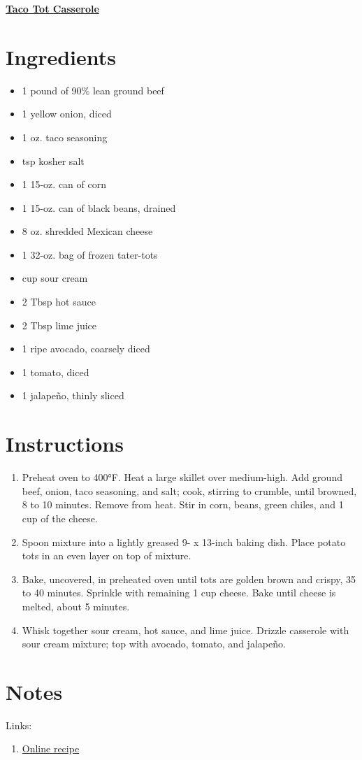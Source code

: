 \documentclass[11pt]{article}
\begin{document}
	\begin{center}\begin{huge}\underline{\textbf{Taco Tot Casserole}}\end{huge}\end{center}

	\section*{Ingredients}
	\begin{itemize}
		\item 1 pound of 90\% lean ground beef
		\item 1 yellow onion, diced
		\item 1 oz. taco seasoning
		\item {} tsp kosher salt
		\item 1 15-oz. can of corn
		\item 1 15-oz. can of black beans, drained
		\item 8 oz. shredded Mexican cheese
		\item 1 32-oz. bag of frozen tater-tots
		\item {} cup sour cream
		\item 2 Tbsp hot sauce
		\item 2 Tbsp lime juice
		\item 1 ripe avocado, coarsely diced
		\item 1 tomato, diced
		\item 1 jalape\~{n}o, thinly sliced
	\end{itemize}
	
	\section*{Instructions}
	\begin{enumerate}
		\item Preheat oven to 400°F. Heat a large skillet over medium-high. Add ground beef, onion, taco seasoning, and salt; cook, stirring to crumble, until browned, 8 to 10 minutes. Remove from heat. Stir in corn, beans, green chiles, and 1 cup of the cheese.
		
		\item Spoon mixture into a lightly greased 9- x 13-inch baking dish. Place potato tots in an even layer on top of mixture.
		
		\item Bake, uncovered, in preheated oven until tots are golden brown and crispy, 35 to 40 minutes. Sprinkle with remaining 1 cup cheese. Bake until cheese is melted, about 5 minutes.
		
		\item Whisk together sour cream, hot sauce, and lime juice. Drizzle casserole with sour cream mixture; top with avocado, tomato, and jalapeño.
	\end{enumerate}
	
	\section*{Notes}
	Links:
	\begin{enumerate}
		\item \href{https://www.myrecipes.com/recipe/taco-tot-casserole}{Online recipe}
	\end{enumerate}
	
\end{document}
